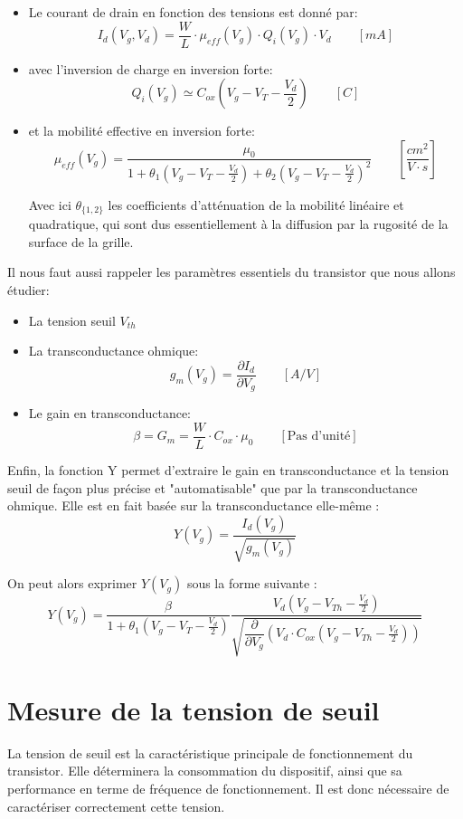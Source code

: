 \documentclass[a4paper,11pt]{report}
\begin{document}
\begin{itemize}
    \item Le courant de drain en fonction des tensions est donné par:
        \[I_d (V_g, V_d) = \frac{W}{L} \cdot \mu_{eff}(V_g) \cdot Q_i(V_g) \cdot V_d \qquad [mA]\] 
    \item avec l'inversion de charge en inversion forte:
        \[Q_i(V_g) \simeq C_{ox}(V_g - V_T - \frac{V_d}{2}) \qquad [C]\]
    \item et la mobilité effective en inversion forte:
        \[\mu_{eff}(V_g) =\frac{\mu_0}{1+\theta_1 (V_g - V_T - \frac{V_d}{2}) 
                                        +\theta_2 (V_g - V_T - \frac{V_d}{2})^2} \qquad [\frac{cm^2}{V\cdot s}] \]

        Avec ici $\theta_{\{1,2\}}$ les coefficients d'atténuation de la mobilité linéaire et quadratique, qui sont dus essentiellement à la diffusion par la rugosité de la surface de la grille. 
\end{itemize}

Il nous faut aussi rappeler les paramètres essentiels du transistor que nous allons étudier: 
\begin{itemize}
    \item La tension seuil $V_{th}$
    \item La transconductance ohmique:
        \[g_m (V_g) = \dfrac{\partial I_d}{\partial V_g} \qquad [A/V]\]
    \item Le gain en transconductance:
        \[\beta = G_m = \dfrac{W}{L} \cdot C_{ox} \cdot \mu_0 \qquad [\text{Pas d'unité}]\]
\end{itemize}

Enfin, la fonction Y permet d'extraire le gain en transconductance et la tension seuil de façon plus précise et "automatisable" que par la transconductance ohmique. Elle est en fait basée sur la transconductance elle-même :
\[ Y(V_g) = \frac{I_d(V_g)}{\sqrt{g_m(V_g)}}
\]

On peut alors exprimer $Y(V_g)$ sous la forme suivante :
\[Y(V_g) = \frac{\beta}{1+ \theta_1 (V_g - V_T - \frac{V_d}{2})} \frac{V_d (V_g - V_{Th} - \frac{V_d}{2})}{\sqrt{\dfrac{\partial}{\partial V_g}(V_d \cdot C_{ox} (V_g - V_{Th} - \frac{V_d}{2}))}}
\]


\chapter{Mesure de la tension de seuil}
La tension de seuil est la caractéristique principale de fonctionnement du transistor. Elle déterminera la consommation du dispositif, ainsi que sa performance en terme de fréquence de fonctionnement. Il est donc nécessaire de caractériser correctement cette tension.
\end{document}
